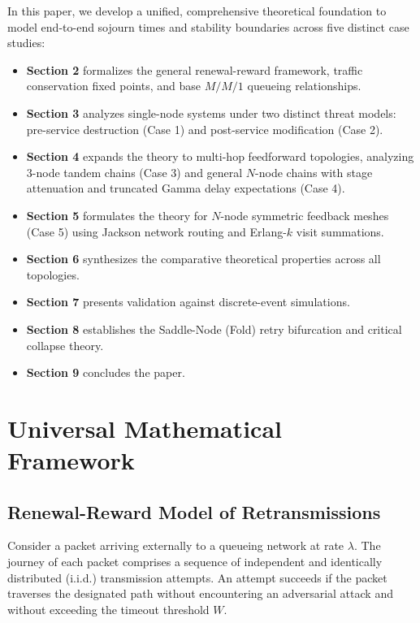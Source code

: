 \documentclass[journal,compsoc]{IEEEtran}
\begin{document}
In this paper, we develop a unified, comprehensive theoretical foundation to model end-to-end sojourn times and stability boundaries across five distinct case studies:
\begin{itemize}
    \item \textbf{Section 2} formalizes the general renewal-reward framework, traffic conservation fixed points, and base $M/M/1$ queueing relationships.
    \item \textbf{Section 3} analyzes single-node systems under two distinct threat models: pre-service destruction (Case 1) and post-service modification (Case 2).
    \item \textbf{Section 4} expands the theory to multi-hop feedforward topologies, analyzing 3-node tandem chains (Case 3) and general $N$-node chains with stage attenuation and truncated Gamma delay expectations (Case 4).
    \item \textbf{Section 5} formulates the theory for $N$-node symmetric feedback meshes (Case 5) using Jackson network routing and Erlang-$k$ visit summations.
    \item \textbf{Section 6} synthesizes the comparative theoretical properties across all topologies.
    \item \textbf{Section 7} presents validation against discrete-event simulations.
    \item \textbf{Section 8} establishes the Saddle-Node (Fold) retry bifurcation and critical collapse theory.
    \item \textbf{Section 9} concludes the paper.
\end{itemize}

\section{Universal Mathematical Framework}
\subsection{Renewal-Reward Model of Retransmissions}
Consider a packet arriving externally to a queueing network at rate $\lambda$. The journey of each packet comprises a sequence of independent and identically distributed (i.i.d.) transmission attempts. An attempt succeeds if the packet traverses the designated path without encountering an adversarial attack and without exceeding the timeout threshold $W$.
\end{document}
